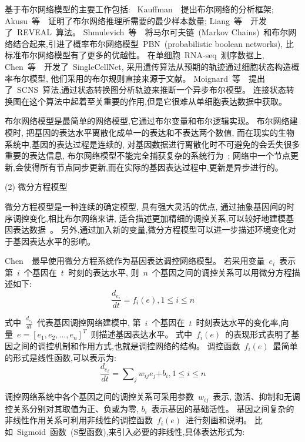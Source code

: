 基于布尔网络模型的主要工作包括:
~Kauffman~\cite{kauffman2003random}~提出布尔网络的分析框架;
Akusu~等~\cite{akutsu1999identification}~证明了布尔网络推理所需要的最少样本数量;
Liang~等~\cite{liang1998reveal}~开发了~REVEAL~算法。
Shmulevich~等~\cite{marshall2007inference}~将马尔可夫链~(Markov Chains)~和布尔网络结合起来,引进了概率布尔网络模型~PBN~(probabilistic boolean networks),
比标准布尔网络模型有了更多的优越性。
在单细胞~RNA-seq~测序数据上,
Chen~等~\cite{chen2014single}~开发了~SingleCellNet,
采用遗传算法从预期的轨迹通过细胞状态构造概率布尔模型, 他们采用的布尔规则直接来源于文献。
Moignard~等~\cite{moignard2015decoding}~提出了~SCNS~算法,通过状态转换图分析轨迹来推断一个异步布尔模型。
连接状态转换图在这个算法中起着至关重要的作用,但是它很难从单细胞表达数据中获取。

布尔网络模型是最简单的网络模型,它通过布尔变量和布尔逻辑实现。
布尔网络建模时, 把基因的表达水平离散化成单一的表达和不表达两个数值,
而在现实的生物系统中,基因的表达过程是连续的,
对基因数据进行离散化时不可避免的会丢失很多重要的表达信息,
布尔网络模型不能完全捕获复杂的系统行为~\cite{lee2009computational};
网络中一个节点更新,会使得所有节点同步更新,而在实际的基因表达过程中,更新是异步进行的。

(2) 微分方程模型

微分方程模型是一种连续的确定模型, 具有强大灵活的优点,
通过抽象基因间的时序调控变化,相比布尔网络来讲, 适合描述更加精细的调控关系,可以较好地建模基因表达数据~\cite{gardner2003inferring,di2005chemogenomic,bansal2006inference, honkela2010model,lu2011high,li2011large}。
另外,通过加入新的变量,微分方程模型可以进一步描述环境变化对于基因表达水平的影响。

Chen~\cite{chen1999modeling}~最早使用微分方程系统作为基因表达调控网络模型。
若采用变量~$e_i$~表示第~$i$~个基因在~$t$~时刻的表达水平, 则~$n$~个基因之间的调控关系可以用微分方程描述如下:
\begin{equation}
\frac{{d_{e_i}}}{{dt}} = f_i (e),1 \le i \le n
\end{equation}

式中~$\frac{{d_{e_i }}}{{dt}}$~代表基因调控网络建模中,
第~$i$~个基因在~$t$~时刻表达水平的变化率,向量~$e=[e_1,e_2,...,e_n]^T$~则描述基因表达水平。
式中~$f_i(e)$~的表现形式表明了基因之间的调控机制和作用方式,也就是调控网络的结构。
调控函数~$f_i(e)$~最简单的形式是线性函数,可以表示为:
\begin{equation}
\frac{{d_{e_i }}}{{dt}} = \sum\nolimits_j {w_{ij} e_j} { + b_i } ,1 \le i \le n
\end{equation}

调控网络系统中各个基因之间的调控关系可采用参数~$w_{ij}$~表示,
激活、抑制和无调控关系分别对其取值为正、负或为零, $b_i$~表示基因的基础活性。
基因之间复杂的非线性作用关系可利用非线性的调控函数~$f_i(e)$~进行刻画和说明。
比如~Sigmoid~函数~(S型函数),来引入必要的非线性,具体表达形式为:

